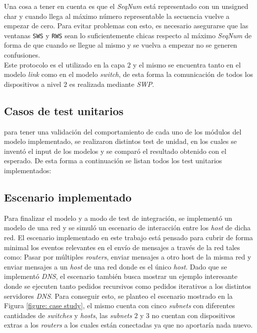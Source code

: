 \documentclass[10pt,a4paper]{article}
\begin{document}
Una cosa a tener en cuenta es que el \textit{SeqNum} está representado con un unsigned char y cuando llega al máximo número representable la secuencia vuelve a empezar de cero. Para evitar problemas con esto, es necesario asegurarse que las ventanas \texttt{SWS} y \texttt{RWS} sean lo suficientemente chicas respecto al máximo \textit{SeqNum} de forma de que cuando se llegue al mismo y se vuelva a empezar no se generen confusiones. \\

Este protocolo es el utilizado en la capa $2$ y el mismo se encuentra tanto en el modelo \textit{link} como en el modelo \textit{switch}, de esta forma la comunicación de todos los dispositivos a nivel $2$ es realizada mediante \textit{SWP}.

\subsection{Casos de test unitarios}

para tener una validación del comportamiento de cada uno de los módulos del modelo implementado, se realizaron distintos test de unidad, en los cuales se inventó el input de los modelos y se comparó el resultado obtenido con el esperado. De esta forma a continuación se listan todos los test unitarios implementados: \\


\subsection{Escenario implementado}

Para finalizar el modelo y a modo de test de integración, se implementó un modelo de una red y se simuló un escenario de interacción entre los \textit{host} de dicha red. El escenario implementado en este trabajo está pensado para cubrir de forma minimal los eventos relevantes en el envío de mensajes a través de la red tales como: Pasar por múltiples \textit{routers}, enviar mensajes a otro host de la misma red y enviar mensajes a un \textit{host} de una red donde es el único \textit{host}. Dado que se implementó \textit{DNS}, el escenario también busca mostrar un ejemplo interesante donde se ejecuten tanto pedidos recursivos como pedidos iterativos a los distintos servidores \textit{DNS}. Para conseguir esto, se planteo el escenario mostrado en la Figura \ref{figure: case study}, el mismo cuenta con cinco \textit{subnets} con diferentes cantidades de \textit{switches} y \textit{hosts}, las \textit{subnets} $2$ y $3$ no cuentan con dispositivos extras a los \textit{routers} a los cuales están conectadas ya que no aportaría nada nuevo. \\
\end{document}
